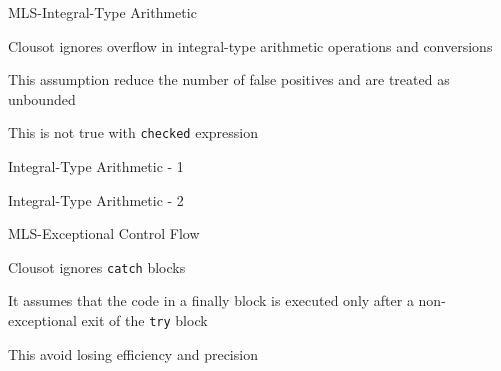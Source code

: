 
\begin{frame}{MLS-Integral-Type Arithmetic}

\vspace*{-0.4cm}

Clousot ignores overflow in integral-type arithmetic operations and conversions

\vspace*{0.6cm}

This assumption reduce the number of false positives and are treated as
unbounded

\vspace*{0.6cm}

This is not true with \texttt{checked} expression

\end{frame}


\begin{frame}[fragile]{Integral-Type Arithmetic - 1}
\vspace*{-0.4cm}
\only<1>{}
\end{frame}


\begin{frame}[fragile]{Integral-Type Arithmetic - 2}
\vspace*{-0.4cm}
\only<1>{}
\end{frame}


\begin{frame}{MLS-Exceptional Control Flow}

\vspace*{-0.4cm}

Clousot ignores \texttt{catch} blocks 

\vspace*{0.6cm}

It assumes that the code in a finally block is executed only after a
non-exceptional exit of the \texttt{try} block

\vspace*{0.6cm}

This avoid losing efficiency and precision

\end{frame}


